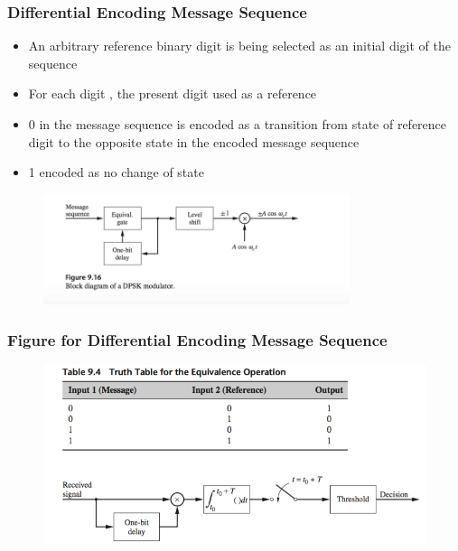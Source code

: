 \documentclass{beamer}
\begin{document}
\begin{frame}
	\frametitle{Differential Encoding Message Sequence}
	\begin{itemize}
		\item An arbitrary reference binary digit is being selected as an initial digit of the sequence
		\item For each digit , the present digit used as a reference
		\item 0 in the message sequence is encoded as  a transition from state of reference digit to the opposite state in the encoded message sequence
		\item 1 encoded as no change of state
	\end{itemize}
	\begin{figure}
		\includegraphics[width=0.8\textwidth]{9_3_1.png} \\
	\end{figure}
\end{frame}

\begin{frame}
\frametitle{Figure for Differential Encoding Message Sequence}
	\begin{figure}
		\includegraphics[width=\textwidth]{9_4_1.png}
	\end{figure}
\end{frame}
\end{document}
